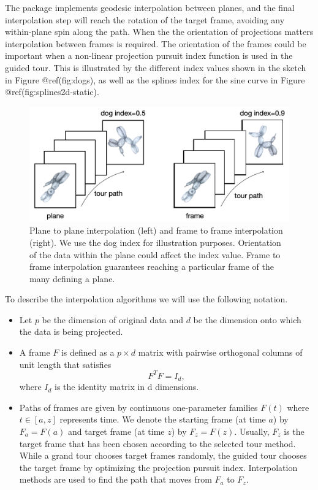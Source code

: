 \documentclass[
]{article}
\begin{document}
The  package implements geodesic interpolation between
planes, and the final interpolation step will reach the rotation of the
target frame, avoiding any within-plane spin along the path. When the
the orientation of projections matters interpolation between frames is
required. The orientation of the frames could be important when a
non-linear projection pursuit index function is used in the guided tour.
This is illustrated by the different index values shown in the sketch in
Figure @ref(fig:dogs), as well as the splines index for the sine curve
in Figure @ref(fig:splines2d-static).

\begin{figure}

{\centering \includegraphics[width=1\linewidth]{figures/dog_index} 

}

\caption{Plane to plane interpolation (left) and frame to frame interpolation (right). We use the dog index for illustration purposes. Orientation of the data within the plane could affect the index value. Frame to frame interpolation guarantees reaching a particular frame of the many defining a plane.}\label{fig:dogs}
\end{figure}

To describe the interpolation algorithms we will use the following
notation.

\begin{itemize}
\item
  Let \(p\) be the dimension of original data and \(d\) be the dimension
  onto which the data is being projected.
\item
  A frame \(F\) is defined as a \(p\times d\) matrix with pairwise
  orthogonal columns of unit length that satisfies \[F^TF = I_d,\] where
  \(I_d\) is the identity matrix in d dimensions.
\item
  Paths of frames are given by continuous one-parameter families
  \(F(t)\) where \(t\in [a, z]\) represents time. We denote the starting
  frame (at time \(a\)) by \(F_a = F(a)\) and target frame (at time
  \(z\)) by \(F_z = F(z)\). Usually, \(F_z\) is the target frame that
  has been chosen according to the selected tour method. While a grand
  tour chooses target frames randomly, the guided tour chooses the
  target frame by optimizing the projection pursuit index. Interpolation
  methods are used to find the path that moves from \(F_a\) to \(F_z\).
\end{itemize}
\end{document}
